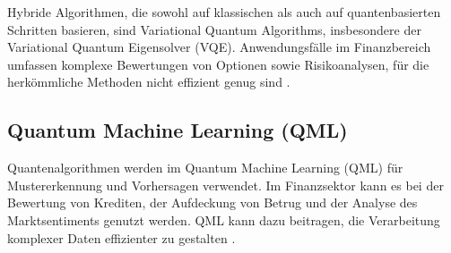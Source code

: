 Hybride Algorithmen, die sowohl auf klassischen als auch auf quantenbasierten Schritten basieren, sind Variational Quantum Algorithms, insbesondere der Variational Quantum Eigensolver (VQE). Anwendungsfälle im Finanzbereich umfassen komplexe Bewertungen von Optionen sowie Risikoanalysen, für die herkömmliche Methoden nicht effizient genug sind \cite{bouland2020,martin2022}.

\subsection{Quantum Machine Learning (QML)}

Quantenalgorithmen werden im Quantum Machine Learning (QML) für Mustererkennung und Vorhersagen verwendet. Im Finanzsektor kann es bei der Bewertung von Krediten, der Aufdeckung von Betrug und der Analyse des Marktsentiments genutzt werden. QML kann dazu beitragen, die Verarbeitung komplexer Daten effizienter zu gestalten \cite{bouland2020,martin2022}.


